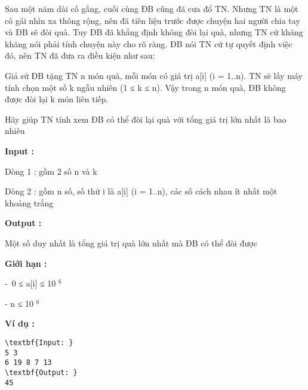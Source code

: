 

Sau một năm dài cố gắng, cuối cùng ĐB cũng đã cưa đổ TN. Nhưng TN là một cô gái nhìn xa thông rộng, nên đã tiên liệu trước được chuyện hai người chia tay và ĐB sẽ đòi quà. Tuy ĐB đã khẳng định không đòi lại quà, nhưng TN cứ khăng khăng nói phải tính chuyện này cho rõ ràng. ĐB nói TN cứ tự quyết định việc đó, nên TN đã đưa ra điều kiện như sau:

Giả sử ĐB tặng TN n món quà, mỗi món có giá trị a[i] (i = 1..n). TN sẽ lấy máy tính chọn một số k ngẫu nhiên (1 ≤ k ≤ n). Vậy trong n món quà, ĐB không được đòi lại k món liên tiếp.

Hãy giúp TN tính xem ĐB có thể đòi lại quà với tổng giá trị lớn nhất là bao nhiêu

\textbf{Input : }

Dòng 1 : gồm 2 số n và k

Dòng 2 : gồm n số, số thứ i là a[i] (i = 1..n), các số cách nhau ít nhất một khoảng trắng

\textbf{Output : }

Một số duy nhất là tổng giá trị quà lớn nhất mà ĐB có thể đòi được

\textbf{Giới hạn : }

- 0 ≤ a[i] ≤ 10 $^ 6 $

- n ≤ 10 $^ 6 $

\textbf{Ví dụ : }
\begin{verbatim}
\textbf{Input: }
5 3
6 19 8 7 13
\textbf{Output: }
45\end{verbatim}